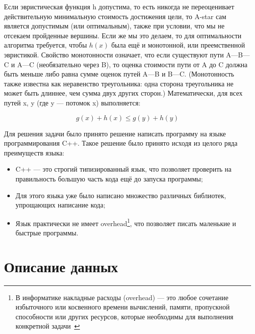 \documentclass[12pt,chapterprefix=true,headings=onelineappendix]{scrartcl}
\begin{document}
Если эвристическая функция h допустима, то есть никогда не переоценивает
действительную ми\-ни\-маль\-ную стоимость достижения цели, то A-star сам является
допустимым (или оптимальным), также при условии, что мы не отсекаем пройденные
вершины. Если же мы это делаем, то для оптимальности алгоритма требуется, чтобы
$h(x)$ была ещё и монотонной, или преемственной эвристикой. Свойство монотонности
означает, что если существуют пути A—B—C и A—C (необязательно через B), то
оценка стоимости пути от A до C должна быть меньше либо равна сумме оценок
путей A—B и B—C. (Монотонность также известна как неравенство треугольника:
одна сторона треугольника не может быть длиннее, чем сумма двух других сторон.)
Математически, для всех путей x, y (где y — потомок x) выполняется:

\[ g(x) + h(x) \leq g(y) + h(y) \]

Для решения задачи было принято решение написать программу на языке
программирования C++. Такое решение было принято исходя из целого ряда
преимуществ языка:

\begin{itemize}
	\item C++ --- это строгий типизированный язык, что позволяет проверить на
	      правильность большую часть кода ещё до запуска программы;
	\item Для этого языка уже было написано множество различных библиотек,
	      упрощающих написание кода;
	\item Язык практически не имеет overhead\footnote{В информатике накладные
		      расходы (overhead) --- это любое сочетание избыточного или косвенного
		      времени вычислений, памяти, пропускной способности или других ресурсов,
		      которые необходимы для выполнения конкретной
		      задачи~\cite{NVIDIACorporation2020}}, что позволяет писать маленькие и
	      быстрые программы.
\end{itemize}

\newpage{}
\section{Описание данных}
\end{document}
